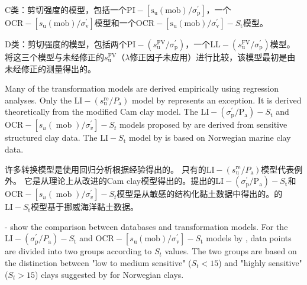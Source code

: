 \begin{ParaColumn}
    C类：剪切强度的模型，包括一个$\mathrm{PI}-\left[\mathrm{s}_{\mathrm{u}}(\mathrm{mob}) / \sigma_{\mathrm{p}}^{\prime}\right]$，一个$\mathrm{OCR}-\left[s_{\mathrm{u}}(\mathrm{mob}) / \sigma_{\mathrm{v}}^{\prime}\right]$模型和一个$\mathrm{OCR}-\left[\mathrm{s}_{\mathrm{u}}(\mathrm{mob}) / \sigma_{\mathrm{v}}^{\prime}\right]-S_{\mathrm{t}}$模型。
   
    D类：剪切强度的模型，包括两个$\mathrm{PI}-\left(s_{\mathrm{u}}^{\mathrm{FV}} / \sigma_{\mathrm{p}}^{\prime}\right)$，一个$\mathrm{LL}-\left(s_{\mathrm{u}}^{\mathrm{FV}} / \sigma_{\mathrm{p}}^{\prime}\right)$模型。 将这三个模型与未经修正的$s_{\mathrm{u}}^{\mathrm{FV}}$（$\lambda$修正因子未应用）进行比较，该模型最初是由未经修正的测量得出的。

    \switchcolumn*

    Many of the transformation models are derived empirically using regression analyses. Only the $\mathrm{LI}-\left(s_{\mathrm{u}}^{\mathrm{re}} / P_{\mathrm{a}}\right)$ model by \citet{Wroth1978137} represents an exception. It is derived theoretically from the modified Cam clay model. The $\mathrm{LI}-\left(\sigma_{\mathrm{p}}^{\prime} / \mathrm{P}_{\mathrm{a}}\right)-S_{\mathrm{t}}$ and $\mathrm{OCR}-\left[s_{u}(\operatorname{mob}) / \sigma_{v}^{\prime}\right]-S_{t}$ models proposed by \citet{Ching2012522} are derived from sensitive structured clay data. The $\mathrm{LI}-S_{\mathrm{t}}$ model by \citet{Bjerrum195449} is based on Norwegian marine clay data.

    \switchcolumn

    许多转换模型是使用回归分析根据经验得出的。 只有\citet{Wroth1978137}的$\mathrm{LI}-\left(s_{\mathrm{u}}^{\mathrm{re}} / P_{\mathrm{a}}\right)$模型代表例外。 它是从理论上从改进的Cam clay模型得出的。\citet{Ching2012522}提出的$\mathrm{LI}-\left(\sigma_{\mathrm{p}}^{\prime} / \mathrm{P}_{\mathrm{a}}\right)-S_{\mathrm{t}}$和$\mathrm{OCR}-\left[s_{u}(\operatorname{mob}) / \sigma_{v}^{\prime}\right]-S_{t}$模型是从敏感的结构化黏土数据中得出的。\citet{Bjerrum195449}的$\mathrm{LI}-S_{\mathrm{t}}$模型基于挪威海洋黏土数据。

    
    
    
    
    

    \switchcolumn*
    
    - show the comparison between databases and transformation models. For the $\mathrm{LI}-\left(\sigma_{\mathrm{p}}^{\prime} / P_{\mathrm{a}}\right)-S_{\mathrm{t}}$ and $\mathrm{OCR}-\left[s_{\mathrm{u}}(\mathrm{mob}) / \sigma_{\mathrm{v}}^{\prime}\right]-S_{\mathrm{t}}$ models by \citet{Ching2012522}, data points are divided into two groups according to $S_t$ values. The two groups are based on the distinction between "low to medium sensitive" ($S_t<15$) and "highly sensitive" ($S_t>15$) clays suggested by \citet{Karlsrud20131273} for Norwegian clays.


\end{ParaColumn}
